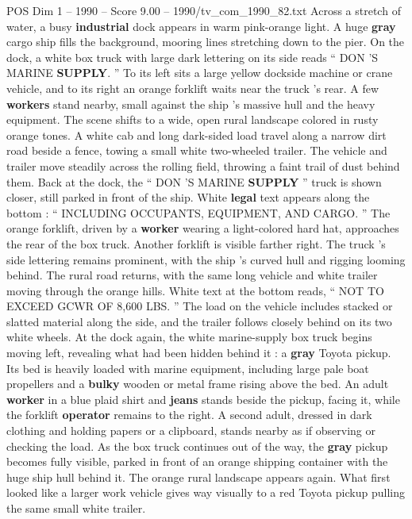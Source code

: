 \begin{textsample}{POS Dim 1 – 1990 – Score 9.00 – 1990/tv\_com\_1990\_82.txt}  \label{ex:f1_pos_047}
Across a stretch of water, a busy \textbf{industrial} dock appears in warm pink-orange light.
A huge \textbf{gray} cargo ship fills the background, mooring lines stretching down to the pier.
On the dock, a white box truck with large dark lettering on its side reads “ DON ’S MARINE \textbf{SUPPLY}. ” To its left sits a large yellow dockside machine or crane vehicle, and to its right an orange forklift waits near the truck ’s rear.
A few \textbf{workers} stand nearby, small against the ship ’s massive hull and the heavy equipment.
The scene shifts to a wide, open rural landscape colored in rusty orange tones.
A white cab and long dark-sided load travel along a narrow dirt road beside a fence, towing a small white two-wheeled trailer.
The vehicle and trailer move steadily across the rolling field, throwing a faint trail of dust behind them.
Back at the dock, the “ DON ’S MARINE \textbf{SUPPLY} ” truck is shown closer, still parked in front of the ship.
White \textbf{legal} text appears along the bottom : “ INCLUDING OCCUPANTS, EQUIPMENT, AND CARGO. ” The orange forklift, driven by a \textbf{worker} wearing a light-colored hard hat, approaches the rear of the box truck.
Another forklift is visible farther right.
The truck ’s side lettering remains prominent, with the ship ’s curved hull and rigging looming behind.
The rural road returns, with the same long vehicle and white trailer moving through the orange hills.
White text at the bottom reads, “ NOT TO EXCEED GCWR OF 8,600 LBS. ” The load on the vehicle includes stacked or slatted material along the side, and the trailer follows closely behind on its two white wheels.
At the dock again, the white marine-supply box truck begins moving left, revealing what had been hidden behind it : a \textbf{gray} Toyota pickup.
Its bed is heavily loaded with marine equipment, including large pale boat propellers and a \textbf{bulky} wooden or metal frame rising above the bed.
An adult \textbf{worker} in a blue plaid shirt and \textbf{jeans} stands beside the pickup, facing it, while the forklift \textbf{operator} remains to the right.
A second adult, dressed in dark clothing and holding papers or a clipboard, stands nearby as if observing or checking the load.
As the box truck continues out of the way, the \textbf{gray} pickup becomes fully visible, parked in front of an orange shipping container with the huge ship hull behind it.
The orange rural landscape appears again.
What first looked like a larger work vehicle gives way visually to a red Toyota pickup pulling the same small white trailer.

\end{textsample}
